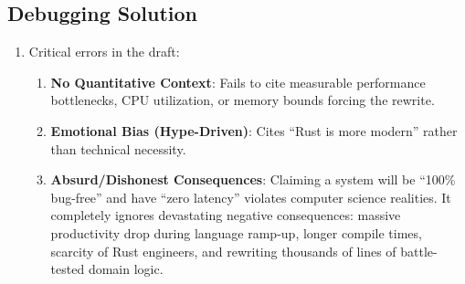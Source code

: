 \subsection*{Debugging Solution}
\begin{enumerate}[leftmargin=18pt]
  \item Critical errors in the draft:
  \begin{enumerate}
    \item \textbf{No Quantitative Context}: Fails to cite measurable performance bottlenecks, CPU utilization, or memory bounds forcing the rewrite.
    \item \textbf{Emotional Bias (Hype-Driven)}: Cites ``Rust is more modern'' rather than technical necessity.
    \item \textbf{Absurd/Dishonest Consequences}: Claiming a system will be ``100\% bug-free'' and have ``zero latency'' violates computer science realities. It completely ignores devastating negative consequences: massive productivity drop during language ramp-up, longer compile times, scarcity of Rust engineers, and rewriting thousands of lines of battle-tested domain logic.
  \end{enumerate}
\end{enumerate}

